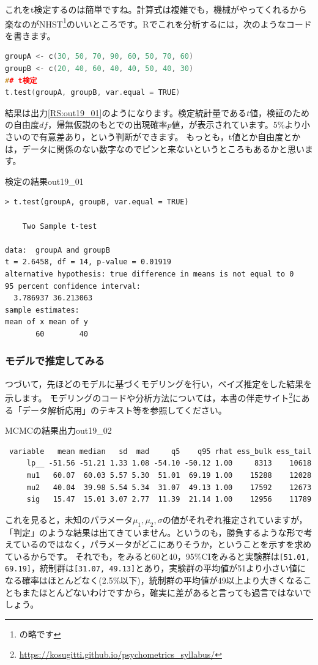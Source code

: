\documentclass{ltjsbook}
\begin{document}
これをt検定するのは簡単ですね。計算式は複雑でも，機械がやってくれるから楽なのがNHST\footnote{の略です}のいいところです。Rでこれを分析するには，次のようなコードを書きます。
\begin{lstlisting}[language=c++,label={code:19_03},caption={帰無仮説検定のコード}]
groupA <- c(30, 50, 70, 90, 60, 50, 70, 60)
groupB <- c(20, 40, 60, 40, 40, 50, 40, 30)
## t検定
t.test(groupA, groupB, var.equal = TRUE)
\end{lstlisting}

結果は出力\ref{RS:out19_01}のようになります。検定統計量である$t$値，検証のための自由度$df$，帰無仮説のもとでの出現確率$p$値，が表示されています。5\%より小さいので有意差あり，という判断ができます。
もっとも，t値とか自由度とかは，データに関係のない数字なのでピンと来ないというところもあるかと思います。
\begin{Rscreen}{検定の結果}{out19_01}
	\begin{verbatim}
> t.test(groupA, groupB, var.equal = TRUE)

	Two Sample t-test

data:  groupA and groupB
t = 2.6458, df = 14, p-value = 0.01919
alternative hypothesis: true difference in means is not equal to 0
95 percent confidence interval:
  3.786937 36.213063
sample estimates:
mean of x mean of y 
       60        40 
\end{verbatim}
\end{Rscreen}

\subsubsection{モデルで推定してみる}
つづいて，先ほどのモデルに基づくモデリングを行い，ベイズ推定をした結果を示します。
モデリングのコードや分析方法については，本書の伴走サイト\footnote{\url{https://kosugitti.github.io/psychometrics_syllabus/}}にある「データ解析応用」のテキスト等を参照してください。
\begin{SCcmd}{MCMCの結果出力}{out19_02}
	\begin{verbatim}
 variable   mean median   sd  mad     q5    q95 rhat ess_bulk ess_tail
     lp__ -51.56 -51.21 1.33 1.08 -54.10 -50.12 1.00     8313    10618
     mu1   60.07  60.03 5.57 5.30  51.01  69.19 1.00    15288    12028
     mu2   40.04  39.98 5.54 5.34  31.07  49.13 1.00    17592    12673
     sig   15.47  15.01 3.07 2.77  11.39  21.14 1.00    12956    11789    
\end{verbatim}
\end{SCcmd}
これを見ると，未知のパラメータ$\mu_1, \mu_2, \sigma$の値がそれぞれ推定されていますが，「判定」のような結果は出てきていません。というのも，勝負するような形で考えているのではなく，パラメータがどこにありそうか，ということを示すを求めているからです。
それでも，をみると60と40，95\%CIをみると実験群は\verb|[51.01, 69.19]|，統制群は\verb|[31.07, 49.13]|とあり，実験群の平均値が51より小さい値になる確率はほとんどなく(2.5\%以下)，統制群の平均値が49以上より大きくなることもまたほとんどないわけですから，確実に差があると言っても過言ではないでしょう。
\end{document}
